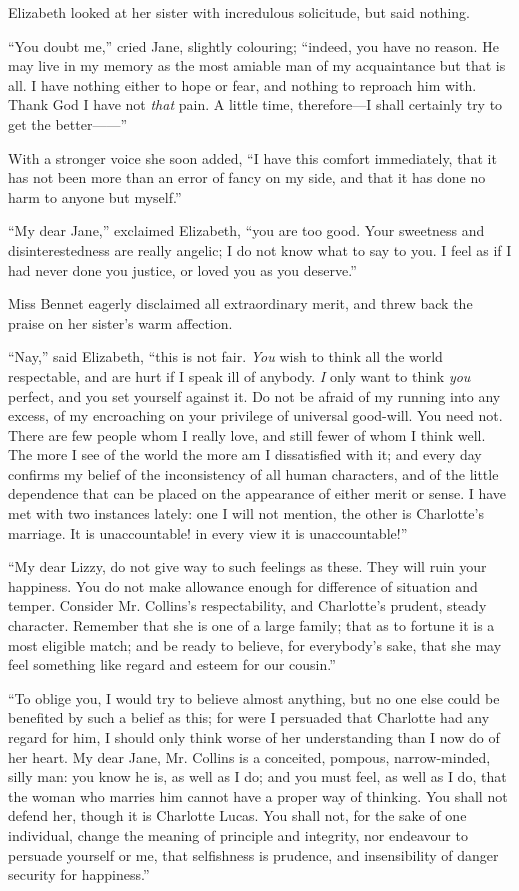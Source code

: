 \documentclass[12pt,openright]{book}
\begin{document}
Elizabeth looked at her sister with incredulous solicitude, but said nothing.

“You doubt me,” cried Jane, slightly colouring; “indeed, you have no reason. He may live in my memory as the most amiable man of my acquaintance but that is all. I have nothing either to hope or fear, and nothing to reproach him with. Thank God I have not \textit{that} pain. A little time, therefore—I shall certainly try to get the better——”

With a stronger voice she soon added, “I have this comfort immediately, that it has not been more than an error of fancy on my side, and that it has done no harm to anyone but myself.”

“My dear Jane,” exclaimed Elizabeth, “you are too good. Your sweetness and disinterestedness are really angelic; I do not know what to say to you. I feel as if I had never done you justice, or loved you as you deserve.”

Miss Bennet eagerly disclaimed all extraordinary merit, and threw back the praise on her sister’s warm affection.

“Nay,” said Elizabeth, “this is not fair. \textit{You} wish to think all the world respectable, and are hurt if I speak ill of anybody. \textit{I} only want to think \textit{you} perfect, and you set yourself against it. Do not be afraid of my running into any excess, of my encroaching on your privilege of universal good-will. You need not. There are few people whom I really love, and still fewer of whom I think well. The more I see of the world the more am I dissatisfied with it; and every day confirms my belief of the inconsistency of all human characters, and of the little dependence that can be placed on the appearance of either merit or sense. I have met with two instances lately: one I will not mention, the other is Charlotte’s marriage. It is unaccountable! in every view it is unaccountable!”

“My dear Lizzy, do not give way to such feelings as these. They will ruin your happiness. You do not make allowance enough for difference of situation and temper. Consider Mr. Collins’s respectability, and Charlotte’s prudent, steady character. Remember that she is one of a large family; that as to fortune it is a most eligible match; and be ready to believe, for everybody’s sake, that she may feel something like regard and esteem for our cousin.”

“To oblige you, I would try to believe almost anything, but no one else could be benefited by such a belief as this; for were I persuaded that Charlotte had any regard for him, I should only think worse of her understanding than I now do of her heart. My dear Jane, Mr. Collins is a conceited, pompous, narrow-minded, silly man: you know he is, as well as I do; and you must feel, as well as I do, that the woman who marries him cannot have a proper way of thinking. You shall not defend her, though it is Charlotte Lucas. You shall not, for the sake of one individual, change the meaning of principle and integrity, nor endeavour to persuade yourself or me, that selfishness is prudence, and insensibility of danger security for happiness.”
\end{document}
